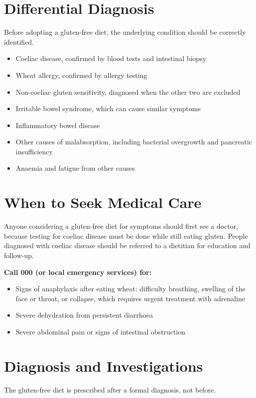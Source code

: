 \section*{Differential Diagnosis}
Before adopting a gluten-free diet, the underlying condition should be correctly identified.

\begin{itemize}
    \item Coeliac disease, confirmed by blood tests and intestinal biopsy
    \item Wheat allergy, confirmed by allergy testing
    \item Non-coeliac gluten sensitivity, diagnosed when the other two are excluded
    \item Irritable bowel syndrome, which can cause similar symptoms
    \item Inflammatory bowel disease
    \item Other causes of malabsorption, including bacterial overgrowth and pancreatic insufficiency
    \item Anaemia and fatigue from other causes
\end{itemize}

\section*{When to Seek Medical Care}
Anyone considering a gluten-free diet for symptoms should first see a doctor, because testing for coeliac disease must be done while still eating gluten. People diagnosed with coeliac disease should be referred to a dietitian for education and follow-up.

\textbf{Call 000 (or local emergency services) for:}
\begin{itemize}
    \item Signs of anaphylaxis after eating wheat: difficulty breathing, swelling of the face or throat, or collapse, which requires urgent treatment with adrenaline
    \item Severe dehydration from persistent diarrhoea
    \item Severe abdominal pain or signs of intestinal obstruction
\end{itemize}

\section*{Diagnosis and Investigations}
The gluten-free diet is prescribed after a formal diagnosis, not before.

